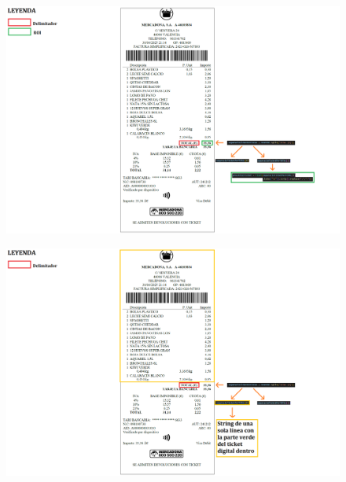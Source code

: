 \documentclass{beamer}
\begin{document}
		\begin{frame}
			\begin{figure}
				\centering
				\includegraphics[width=1\linewidth]{imgEspecifiques/ticketExtraccioE.png}
				\label{fig:ticketExtraccioE}
			\end{figure}
		\end{frame}
		
		\begin{frame}
			\begin{figure}
				\centering
				\includegraphics[width=1\linewidth]{imgEspecifiques/ticketExtraccioF.png}
				\label{fig:ticketExtraccioF}
			\end{figure}
		\end{frame}
		
\end{document}
